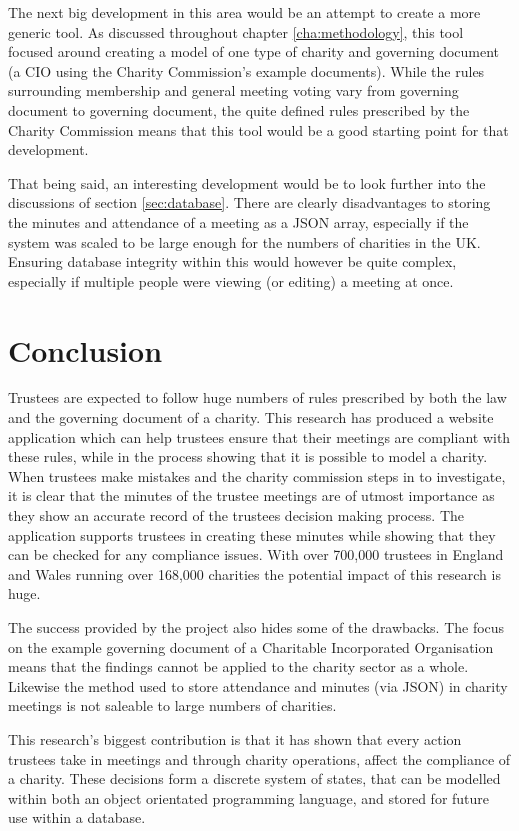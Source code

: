 \documentclass{UoYCSproject}
\begin{document}
The next big development in this area would be an attempt to create a more generic tool. As discussed throughout chapter \ref{cha:methodology}, this tool focused around creating a model of one type of charity and governing document (a CIO using the Charity Commission's example documents). While the rules surrounding membership and general meeting voting vary from governing document to governing document, the quite defined rules prescribed by the Charity Commission means that this tool would be a good starting point for that development. 

That being said, an interesting development would be to look further into the discussions of section \ref{sec:database}. There are clearly disadvantages to storing the minutes and attendance of a meeting as a JSON array, especially if the system was scaled to be large enough for the numbers of charities in the UK. Ensuring database integrity within this would however be quite complex, especially if multiple people were viewing (or editing) a meeting at once. 


\chapter{Conclusion}
\label{cha:conclusion}
Trustees are expected to follow huge numbers of rules prescribed by both the law and the governing document of a charity. This research has produced a website application which can help trustees ensure that their meetings are compliant with these rules, while in the process showing that it is possible to model a charity. When trustees make mistakes and the charity commission steps in to investigate, it is clear that the minutes of the trustee meetings are of utmost importance as they show an  accurate record of the trustees decision making process. The application supports trustees in creating these minutes while showing that they can be checked for any compliance issues. With over 700,000 trustees in England and Wales running over 168,000 charities the potential impact of this research is huge.

The success provided by the project also hides some of the drawbacks. The focus on the example governing document of a Charitable Incorporated Organisation means that the findings cannot be applied to the charity sector as a whole. Likewise the method used to store attendance and minutes (via JSON) in charity meetings is not saleable to large numbers of charities. 

This research's biggest contribution is that it has shown that every action trustees take in meetings and through charity operations, affect the compliance of a charity. These decisions form a discrete system of states, that can be modelled within both an object orientated programming language, and stored for future use within a database. 
\end{document}
